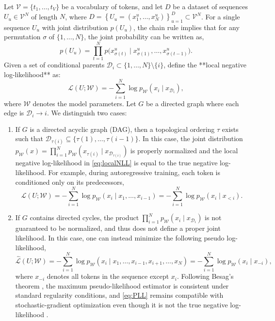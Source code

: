 Let \( \mathcal{V} = \{t_1, \dots, t_V\} \) be a vocabulary of tokens, and let \( D \) be a dataset of sequences \( U_u \in \mathcal{V}^N \) of length \( N \), where $D = \left\{ U_u = (x^u_1, \dots, x^u_N) \right\}_{u=1}^D \subset \mathcal{V}^N$.
%
For a single sequence \( U_u \) with joint distribution \( p(U_u) \), the chain rule implies that for any permutation \( \sigma \) of \( \{1, \dots, N\} \), the joint probability can be written as,
\begin{equation}
p(U_u) = \prod_{t=1}^{N} p\big(x^u_{\sigma(t)} \mid x^u_{\sigma(1)}, \dots, x^u_{\sigma(t-1)}\big).
\label{eq:chain}
\end{equation}
%
Given a set of conditional parents \( \mathcal{D}_i \subset \{1, \dots, N\} \setminus \{i\} \), define the **local negative log-likelihood** as:
\begin{equation}
\mathcal{L}(U; \mathcal{W}) = -\sum_{i=1}^{N} \log p_{\mathcal{W}}(x_i \mid x_{\mathcal{D}_i}),
\label{eq:localNLL}
\end{equation}
where \( \mathcal{W} \) denotes the model parameters.
%
Let \( G \) be a directed graph where each edge is \( \mathcal{D}_i \to i \). We distinguish two cases:
%
\begin{enumerate}
\item 
If \( G \) is a directed acyclic graph (DAG), then a topological ordering \( \tau \) exists such that \( \mathcal{D}_{\tau(i)} \subseteq \{\tau(1), \dots, \tau(i-1)\} \). In this case, the joint distribution $p_{\mathcal{W}}(x) = \prod_{i=1}^N p_{\mathcal{W}}(x_{\tau(i)} \mid x_{\mathcal{D}_{\tau(i)}})
$ is properly normalized and the local negative log-likelihood in \eqref{eq:localNLL} is equal to the true negative log-likelihood.
%
For example, during autoregressive training, each token is conditioned only on its predecessors, 
\begin{equation}
\mathcal{L}(U; \mathcal{W}) = -\sum_{i=1}^N \log p_{\mathcal{W}}(x_i \mid x_1, \dots, x_{i-1}) = -\sum_{i=1}^N \log p_{\mathcal{W}}(x_i \mid x_{<i}).
\label{eq:ARloss}
\end{equation}

\item If \( G \) contains directed cycles, the product $\prod_{i=1}^N p_{\mathcal{W}}(x_i \mid x_{\mathcal{D}_i})$ is not guaranteed to be normalized, and thus does not define a proper joint likelihood.
%
In this case, one can instead minimize the following pseudo log-likelihood,
\begin{equation}
\hat{\mathcal{L}}(U; \mathcal{W}) = -\sum_{i=1}^{N} \log p_{\mathcal{W}}(x_i \mid x_1, \dots, x_{i-1}, x_{i+1}, \dots, x_N) = -\sum_{i=1}^{N} \log p_{\mathcal{W}}(x_i \mid x_{-i}),
\label{eq:PLL}
\end{equation}
where \( x_{-i} \) denotes all tokens in the sequence except \( x_i \).
%
Following Besag's theorem \cite{besag1975statistical}, the maximum pseudo-likelihood estimator is consistent under standard regularity conditions, and \eqref{eq:PLL} remains compatible with stochastic-gradient
optimization even though it is not the true negative log-likelihood \cite{yang2019xlnet}.
\end{enumerate}

